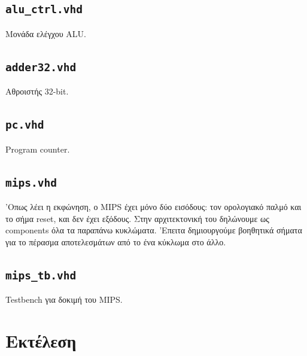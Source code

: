 \documentclass{article}
\begin{document}
\subsection{\lstinline{alu_ctrl.vhd}}

Μονάδα ελέγχου ALU. \\


\pagebreak

\subsection{\lstinline{adder32.vhd}}

Αθροιστής 32-bit. \\


\pagebreak

\subsection{\lstinline{pc.vhd}}

Program counter. \\


\pagebreak

\subsection{\lstinline{mips.vhd}}

'Οπως λέει η εκφώνηση, ο MIPS έχει μόνο δύο εισόδους: τον ορολογιακό παλμό και
το σήμα reset, και δεν έχει εξόδους. Στην αρχιτεκτονική του δηλώνουμε ως components
όλα τα παραπάνω κυκλώματα. 'Επειτα δημιουργούμε βοηθητικά σήματα για το πέρασμα
αποτελεσμάτων από το ένα κύκλωμα στο άλλο. \\


\pagebreak

\subsection{\lstinline{mips_tb.vhd}}

Testbench για δοκιμή του MIPS. \\


\pagebreak

\section{Εκτέλεση}
\end{document}
